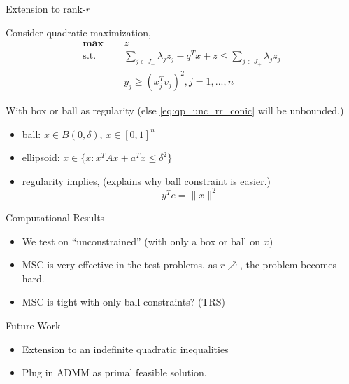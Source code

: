 \documentclass[aspectratio=1610, 10pt]{beamer}
\newcommand{\mx}{\mathbf{\max}\;}
\newcommand{\st}{\mathrm{s.t.\;}}
\begin{document}
\begin{frame}[allowframebreaks]{Extension to rank-\(r\)}

  Consider quadratic maximization,
  \begin{equation}\label{eq:qp_unc_rr_conic}
    \begin{aligned}
      \mx \quad & z                                                                                  \\
      \st \quad & \sum_{j \in J_{-}} \lambda_{j} z_j - q^T x+z \le  \sum_{j \in J_{+}} \lambda_j z_j \\
                & y_j \ge (x_j^T v_j)^2, j= 1, ..., n
    \end{aligned}
  \end{equation}

  With box or ball as regularity (else \eqref{eq:qp_unc_rr_conic} will be unbounded.)
  \begin{itemize}
    \item ball: \(x\in B(0, \delta)\), \(x\in [0, 1]^n\)
    \item ellipsoid: \(x \in \{x: x^TAx + a^Tx \le \delta^2\}\)
    \item regularity implies, (explains why ball constraint is easier.)
          \begin{equation}
            y^Te = \|x\|^2
          \end{equation}
  \end{itemize}
\end{frame}

\begin{frame}[allowframebreaks]{Computational Results}
  \begin{itemize}
    \item We test on ``unconstrained'' (with only a box or ball on \(x\))
    \item MSC is very effective in the test problems. as \(r \nearrow \), the problem becomes hard.
    \item MSC is tight with only ball constraints? (TRS)
  \end{itemize}
\end{frame}

\begin{frame}[allowframebreaks]{Future Work}
  \begin{itemize}
    \item Extension to an indefinite quadratic inequalities
    \item Plug in ADMM as primal feasible solution.
  \end{itemize}
\end{frame}
\end{document}
